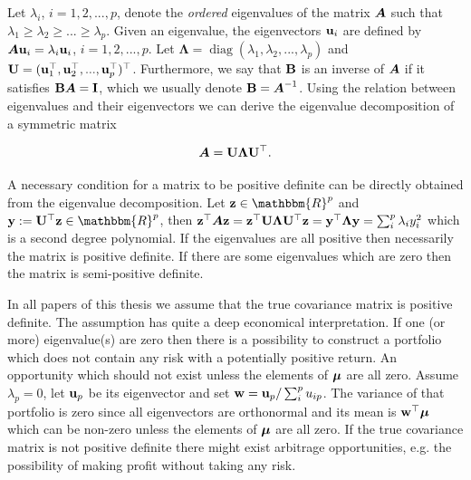 \documentclass[]{book}\usepackage{knitr}
\begin{document}
Let $\lambda_i$, $i=1,2,...,p$, denote the \textit{ordered} eigenvalues of the matrix $\mbox{\boldmath$A$}$ such that $\lambda_1\geq \lambda_2 \geq ... \geq \lambda_p$.
Given an eigenvalue, the eigenvectors $\mathbf{u}_i$ are defined by $\mbox{\boldmath$A$} \mathbf{u}_i = \lambda_i \mathbf{u}_i$, $i=1,2,...,p$. 
Let $\boldsymbol{\Lambda} = \operatorname{diag}(\lambda_1, \lambda_2,...,\lambda_p)$ and $\mathbf{U}= (\mathbf{u}_1^\top, \mathbf{u}_2^\top, ..., \mathbf{u}_p^\top)^\top$. 
Furthermore, we say that $\mathbf{B}$ is an inverse of $\mbox{\boldmath$A$}$ if it satisfies $\mathbf{B} \mbox{\boldmath$A$} = \mathbf{I}$, which we usually denote $\mathbf{B}=\mbox{\boldmath$A$}^{-1}$.
Using the relation between eigenvalues and their eigenvectors we can derive the eigenvalue decomposition of a symmetric matrix 

\begin{equation}\label{eqn:eigenvalue_decomp}
	\mbox{\boldmath$A$} = \mathbf{U} \boldsymbol{\Lambda} \mathbf{U}^{\top}.
\end{equation}

A necessary condition for a matrix to be positive definite can be directly obtained from the eigenvalue decomposition. 
Let $\bz\in \mathbbm{R}^p$ and $\by := \bU^{\top} \bz \in \mathbbm{R}^p$, then $\mathbf{z}^\top \mbox{\boldmath$A$} \mathbf{z} = \mathbf{z}^\top \mathbf{U} \boldsymbol{\Lambda} \mathbf{U} ^{\top} \mathbf{z} = \mathbf{y}^\top \boldsymbol{\Lambda} \mathbf{y} = \sum_i^p \lambda_i y_i^2$ which is a second degree polynomial. 
If the eigenvalues are all positive then necessarily the matrix is positive definite. 
If there are some eigenvalues which are zero then the matrix is semi-positive definite. 

In all papers of this thesis we assume that the true covariance matrix is positive definite. 
The assumption has quite a deep economical interpretation.
If one (or more) eigenvalue(s) are zero then there is a possibility to construct a portfolio which does not contain any risk with a potentially positive return. 
An opportunity which should not exist unless the elements of $\mbox{\boldmath$\mu$}$ are all zero.
Assume $\lambda_p=0$, let $\mathbf{u}_p$ be its eigenvector and set $\mathbf{w} = \mathbf{u}_p / \sum_i^p u_{ip}$. The variance of that portfolio is zero since all eigenvectors are orthonormal and its mean is $\mathbf{w}^\top \mbox{\boldmath$\mu$}$ which can be non-zero unless the elements of $\mbox{\boldmath$\mu$}$ are all zero.
If the true covariance matrix is not positive definite there might exist arbitrage opportunities, e.g. the possibility of making profit without taking any risk.
\end{document}
